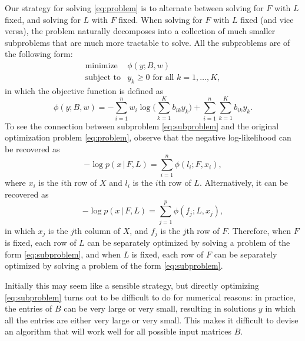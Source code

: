 \documentclass[final]{siamart171218}
\begin{document}
Our strategy for solving \eqref{eq:problem} is to alternate between
solving for $F$ with $L$ fixed, and solving for $L$ with $F$
fixed. When solving for $F$ with $L$ fixed (and vice versa), the
problem naturally decomposes into a collection of much smaller
subproblems that are much more tractable to solve. All the subproblems
are of the following form:
\begin{equation}
\begin{array}{ll}
\mbox{minimize} & \phi(y; B, w) \\
\mbox{subject to} & \mbox{$y_k \geq 0$ for all $k = 1, \ldots, K$},
\end{array}
\label{eq:subproblem}
\end{equation}
in which the objective function is defined as
\begin{equation}
\phi(y; B, w) =
    - \sum_{i=1}^n w_i \log\big({\textstyle \sum_{k=1}^K b_{ik} y_k}\big)
    + \sum_{i=1}^n \sum_{k=1}^K b_{ik} y_k.
\label{eq:subproblem-objective}
\end{equation}
To see the connection between subproblem \eqref{eq:subproblem} and the
original optimization problem \eqref{eq:problem}, observe that the
negative log-likelihood can be recovered as
\begin{equation}
-\log p(x \,|\, F, L) = \sum_{i=1}^n \phi(l_i; F, x_i),
\end{equation}
where $x_i$ is the $i$th row of $X$ and $l_i$ is the $i$th row of $L$.
Alternatively, it can be recovered as
\begin{equation}
-\log p(x \,|\, F, L) = \sum_{j=1}^p \phi(f_j; L, x_j),
\end{equation}
in which $x_j$ is the $j$th column of $X$, and $f_j$ is the $j$th row
of $F$. Therefore, when $F$ is fixed, each row of $L$ can be
separately optimized by solving a problem of the form
\eqref{eq:subproblem}, and when $L$ is fixed, each row of $F$ can be
separately optimized by solving a problem of the form
\eqref{eq:subproblem}.

Initially this may seem like a sensible strategy, but directly
optimizing \eqref{eq:subproblem} turns out to be difficult to do for
numerical reasons: in practice, the entries of $B$ can be very large
or very small, resulting in solutions $y$ in which all the entries are
either very large or very small. This makes it difficult to devise an
algorithm that will work well for all possible input matrices $B$.
\end{document}
